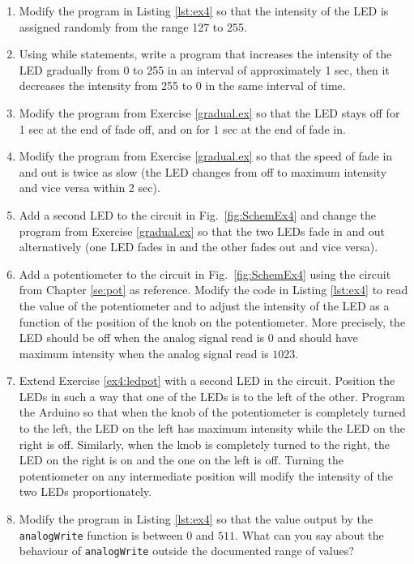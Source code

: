 \documentclass[12pt]{book}
\begin{document}
\begin{enumerate}[1.]
\item Modify the program in Listing \ref*{lst:ex4} so that the
  intensity of the LED is assigned randomly from the range 127 to
  255. 

\item\label{gradual.ex} Using while statements, write a program that
  increases the intensity of the LED gradually from 0 to 255 in an
  interval of approximately 1 sec, then it decreases the intensity
  from 255 to 0 in the same interval of time.
  
\item Modify the program from Exercise \ref{gradual.ex} so that the LED
  stays off for 1 sec at the end of fade off, and on for 1 sec at the
  end of fade in.

\item Modify the program from Exercise \ref{gradual.ex} so that the speed
  of fade in and out is twice as slow (the LED changes from off to
  maximum intensity and vice versa within 2 sec).

\item Add a second LED to the circuit in Fig.~\ref*{fig:SchemEx4} and
  change the program from Exercise \ref{gradual.ex} so that the two LEDs
  fade in and out alternatively (one LED fades in and the other fades
  out and vice versa).

\item\label{ex4:ledpot} Add a potentiometer to the circuit in
  Fig.~\ref*{fig:SchemEx4} using the circuit from Chapter \ref{se:pot}
  as reference. Modify the code in Listing \ref*{lst:ex4} to read the
  value of the potentiometer and to adjust the intensity of the LED as
  a function of the position of the knob on the potentiometer. More
  precisely, the LED should be off when the analog signal read is $0$
  and should have maximum intensity when the analog signal read is $1023$.

\item Extend Exercise \ref*{ex4:ledpot} with a second LED in the
  circuit. Position the LEDs in such a way that one of the LEDs is to
  the left of the other. Program the Arduino so that when the knob of
  the potentiometer is completely turned to the left, the LED on the
  left has maximum intensity while the LED on the right is
  off. Similarly, when the knob is completely turned to the right, the
  LED on the right is on and the one on the left is off. Turning the
  potentiometer on any intermediate position will modify the intensity
  of the two LEDs proportionately. 

\item Modify the program in Listing \ref*{lst:ex4} so that the
  value output by the \lstinline$analogWrite$ function is between $0$
  and $511$. What can you say about the behaviour of
  \lstinline$analogWrite$ outside the documented range of values?
\end{enumerate}
\end{document}
